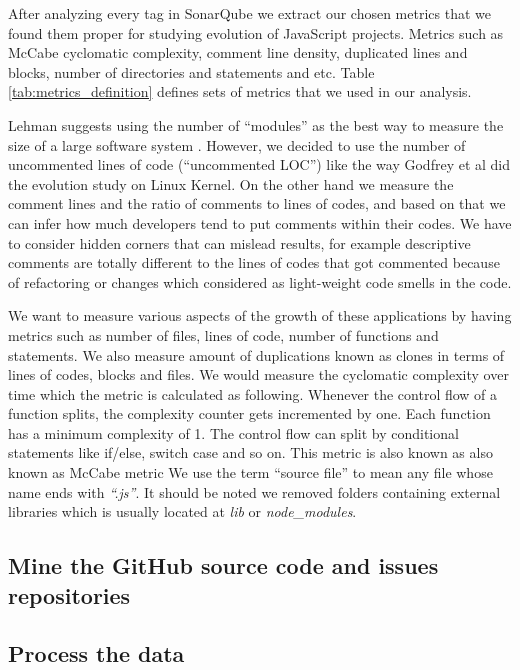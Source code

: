 \par After analyzing every tag in SonarQube we extract our chosen metrics that we found them proper for studying evolution of JavaScript projects. Metrics such as McCabe cyclomatic complexity,  comment line density, duplicated lines and blocks, number of directories and statements and etc. Table  \ref{tab:metrics_definition} defines sets of metrics that we used in our analysis.

\par
Lehman suggests using the number of “modules” as the best way to measure the size of a large software system \cite{Lehman1997METRICS}. However, we decided to use the number of uncommented lines of code (“uncommented LOC”) like the way Godfrey et al \cite{Godfrey2000ICMS} did the evolution study on Linux Kernel. On the other hand we measure the comment lines and the ratio of comments to lines of codes, and based on that we can infer how much developers tend to put comments within their codes. We have to consider hidden corners that can mislead results, for example descriptive comments are totally different to the lines of codes that got commented because of refactoring or changes which considered as light-weight code smells in the code.

\par
We want to measure various aspects of the growth of these applications by having metrics such as number of files, lines of code, number of functions and statements. We also measure amount of duplications known as clones in terms of lines of codes, blocks and files. We would measure the cyclomatic complexity over time which the metric is calculated as following. Whenever the control flow of a function splits, the complexity counter gets incremented by one. Each function has a minimum complexity of 1. The control flow can split by conditional statements like if/else, switch case and so on. This metric is also known as also known as McCabe metric
We use the term “source file” to mean any file whose name ends with \textit{“.js”}. It should be noted we removed folders containing external libraries which is usually located at \textit{lib} or \textit{node\_modules}. 

\subsection{Mine the GitHub source code and issues repositories}

\subsection{Process the data}
